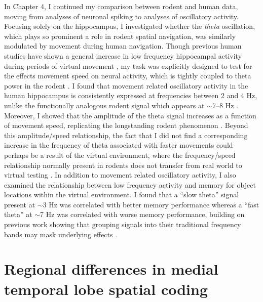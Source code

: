 In Chapter 4, I continued my comparison between rodent and human data, moving from analyses of neuronal spiking to analyses of oscillatory activity. Focusing solely on the hippocampus, I investigated whether the \textit{theta} oscillation, which plays so prominent a role in rodent spatial navigation, was similarly modulated by movement during human navigation. Though previous human studies have shown a general increase in low frequency hippocampal activity during periods of virtual movement \citep{CaplEtal03,EkstEtal05,JacoEtal10c}, my task was explicitly designed to test for the effects movement speed on neural activity, which is tightly coupled to theta power in the rodent \citep{Vand69}. I found that movement related oscillatory activity in the human hippocampus is consistently expressed at frequencies between 2 and 4 Hz, unlike the functionally analogous rodent signal which appears at $\sim$7--8 Hz \citep{Buzs02}. Moreover, I showed that the amplitude of the theta signal increases as a function of movement speed, replicating the longstanding rodent phenomenon \citep{McFaEtal75}. Beyond this amplitude/speed relationship, the fact that I did not find a corresponding increase in the frequency of theta associated with faster movements could perhaps be a result of the virtual environment, where the frequency/speed relationship normally present in rodents does not transfer from real world to virtual testing \citep{RavaEtal13}. In addition to movement related oscillatory activity, I also examined the relationship between low frequency activity and memory for object locations within the virtual environment. I found that a ``slow theta'' signal present at $\sim$3 Hz was correlated with better memory performance whereas a ``fast theta'' at $\sim$7 Hz was correlated with worse memory performance, building on previous work showing that grouping signals into their traditional frequency bands may mask underlying effects \citep{LegaEtal12}.




\section{Regional differences in medial temporal lobe spatial coding}

